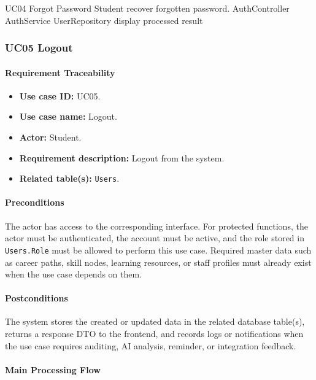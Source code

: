 \SequenceDiagram
{UC04 Forgot Password}
{Student}
{recover forgotten password.}
{AuthController}
{AuthService}
{UserRepository}
{display processed result}

\subsubsection{UC05 Logout}

\paragraph{Requirement Traceability}

\begin{itemize}
    \item \textbf{Use case ID:} UC05.
    \item \textbf{Use case name:} Logout.
    \item \textbf{Actor:} Student.
    \item \textbf{Requirement description:} Logout from the system.
    \item \textbf{Related table(s):} \texttt{Users}.
\end{itemize}

\paragraph{Preconditions}

The actor has access to the corresponding interface. For protected functions, the actor must be authenticated, the account must be active, and the role stored in \texttt{Users.Role} must be allowed to perform this use case. Required master data such as career paths, skill nodes, learning resources, or staff profiles must already exist when the use case depends on them.

\paragraph{Postconditions}

The system stores the created or updated data in the related database table(s), returns a response DTO to the frontend, and records logs or notifications when the use case requires auditing, AI analysis, reminder, or integration feedback.

\paragraph{Main Processing Flow}

